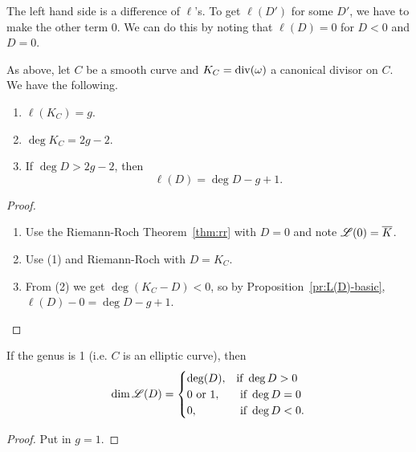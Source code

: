 The left hand side is a difference of $\ell$'s. To get $\ell(D')$ for some $D'$, we have to make the other term 0. We can do this by noting that $\ell(D)=0$ for $D<0$ and $D=0$.
\begin{cor}
As above, let $C$ be a smooth curve and $K_C=\operatorname{div}(\omega)$ a canonical divisor on $C$.
We have the following.
\begin{enumerate}
\item
$\ell(K_C)=g$.
\item
$\deg K_C=2g-2$.
\item
If $\deg D>2g-2$, then 
\[
\ell(D)=\deg D-g+1.
\]
\end{enumerate}
\end{cor}
\begin{proof}
\begin{enumerate}
\item
Use the Riemann-Roch Theorem~\ref{thm:rr} with $D=0$ and note $\mathscr{L}(0)=\overline{K}$.
\item
Use (1) and Riemann-Roch with $D=K_C$. 
\item
From (2) we get $\deg(K_C-D)<0$, so by Proposition~\ref{pr:L(D)-basic}, $\ell(D)-0=\deg D-g+1$. 
\end{enumerate}
\end{proof}

\begin{cor}
If the genus is 1 (i.e. $C$ is an elliptic curve), then
\[
\dim \mathscr{L}(D)=\begin{cases}
\deg(D),&\text{if }\deg D>0\\
0\text{ or }1,&\text{ if }\deg D=0\\
0,&\text{ if }\deg D<0.
\end{cases}
\]
\end{cor}
\begin{proof}
Put in $g=1$.
\end{proof}


